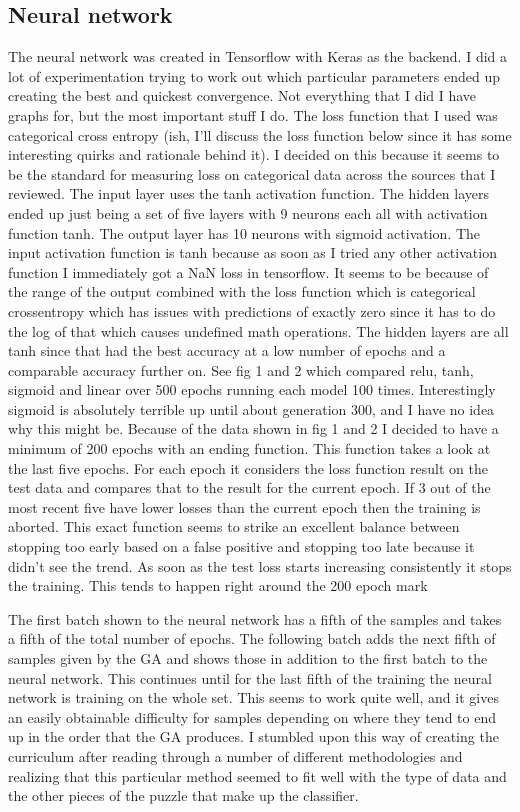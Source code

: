 \documentclass[conference]{IEEEtran}
\begin{document}
\subsection{Neural network}
The neural network was created in Tensorflow with Keras as the backend. I did a lot of experimentation trying to work out which particular parameters ended up creating the best and quickest convergence. Not everything that I did I have graphs for, but the most important stuff I do. The loss function that I used was categorical cross entropy (ish, I'll discuss the loss function below since it has some interesting quirks and rationale behind it). I decided on this because it seems to be the standard for measuring loss on categorical data across the sources that I reviewed.
The input layer uses the tanh activation function. The hidden layers ended up just being a set of five layers with 9 neurons each all with activation function tanh. The output layer has 10 neurons with sigmoid activation. The input activation function is tanh because as soon as I tried any other activation function I immediately got a NaN loss in tensorflow. It seems to be because of the range of the output combined with the loss function which is categorical crossentropy which has issues with predictions of exactly zero since it has to do the log of that which causes undefined math operations. The hidden layers are all tanh since that had the best accuracy at a low number of epochs and a comparable accuracy further on. See fig 1 and 2 which compared relu, tanh, sigmoid and linear over 500 epochs running each model 100 times. Interestingly sigmoid is absolutely terrible up until about generation 300, and I have no idea why this might be.
Because of the data shown in fig 1 and 2 I decided to have a minimum of 200 epochs with an ending function. This function takes a look at the last five epochs. For each epoch it considers the loss function result on the test data and compares that to the result for the current epoch. If 3 out of the most recent five have lower losses than the current epoch then the training is aborted. This exact function seems to strike an excellent balance between stopping too early based on a false positive and stopping too late because it didn't see the trend. As soon as the test loss starts increasing consistently it stops the training. This tends to happen right around the 200 epoch mark


The first batch shown to the neural network has a fifth of the samples and takes a fifth of the total number of epochs. The following batch adds the next fifth of samples given by the GA and shows those in addition to the first batch to the neural network. This continues until for the last fifth of the training the neural network is training on the whole set. This seems to work quite well, and it gives an easily obtainable difficulty for samples depending on where they tend to end up in the order that the GA produces. I stumbled upon this way of creating the curriculum after reading through a number of different methodologies and realizing that this particular method seemed to fit well with the type of data and the other pieces of the puzzle that make up the classifier. 
\end{document}
